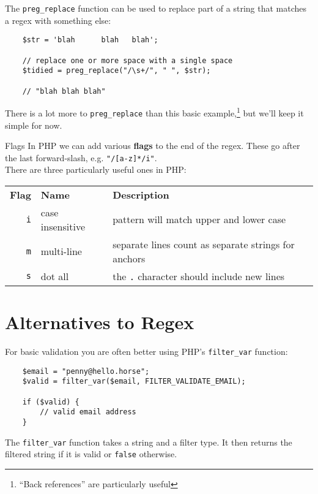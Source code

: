 The \texttt{preg\_replace} function can be used to replace part of a string that matches a regex with something else:

\begin{verbatim}
    $str = 'blah      blah   blah';

    // replace one or more space with a single space
    $tidied = preg_replace("/\s+/", " ", $str);

    // "blah blah blah"
\end{verbatim}


There is a lot more to \texttt{preg\_replace} than this basic example,\footnote{``Back references'' are particularly useful} but we'll keep it simple for now.

\begin{infobox}{Flags}
    In PHP we can add various \textbf{flags} to the end of the regex. These go after the last forward-slash, e.g. \texttt{"/[a-z]*/i"}.
    \\

    There are three particularly useful ones in PHP:

    \begin{tabularx}{\textwidth}{r l X}
        \textbf{Flag}    & \textbf{Name}    & \textbf{Description} \\
        \texttt{i}       & case insensitive & pattern will match upper and lower case \\
        \texttt{m}       & multi-line       & separate lines count as separate strings for anchors\\
        \texttt{s}       & dot all          & the \texttt{.} character should include new lines\\
    \end{tabularx}
\end{infobox}


\section{Alternatives to Regex}

For basic validation you are often better using PHP's \texttt{filter\_var} function:

\begin{verbatim}
    $email = "penny@hello.horse";
    $valid = filter_var($email, FILTER_VALIDATE_EMAIL);

    if ($valid) {
        // valid email address
    }
\end{verbatim}

The \texttt{filter\_var} function takes a string and a filter type. It then returns the filtered string if it is valid or \texttt{false} otherwise.
\\

